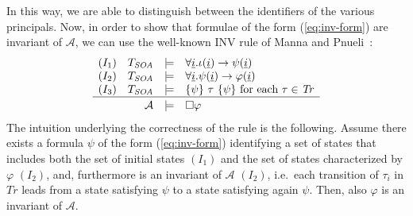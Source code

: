 \documentclass[conference]{IEEEtran}
\begin{document}
In this way, we are able to distinguish between the identifiers of the various principals.  
Now, in order to show that formulae of the form (\ref{eq:inv-form}) are
invariant of $\mathcal{A}$, we can use the well-known INV rule of
Manna and Pnueli~\cite{manna-pnueli-book}:
\begin{eqnarray*}
  \begin{array}{lrcl}
    (I_1) &  T_\mathit{SOA} & \models &
            \forall \underline{i}.\iota(\underline{i})
                                   \rightarrow \psi(\underline{i}) \\
    (I_2) & T_\mathit{SOA} & \models &
            \forall \underline{i}.\psi(\underline{i})
                                   \rightarrow \varphi(\underline{i}) \\
    (I_3) & T_\mathit{SOA} & \models & \{ \psi\}~ \tau~ \{ \psi\} \mbox{ for each } \tau\in \mathit{Tr}\\
    \hline \\[-1em]
          & \mathcal{A} & \models & \Box \varphi
  \end{array}
\end{eqnarray*}
The intuition underlying the correctness of the rule is the following.
Assume there exists a formula $\psi$ of the form
(\ref{eq:inv-form}) identifying a set of states that includes both
the set of initial states $(I_1)$ and the set of states characterized
by $\varphi$ $(I_2)$, and, furthermore is an invariant of
$\mathcal{A}$ $(I_2)$, i.e.\ each transition of $\tau_i$ in
$\mathit{Tr}$ leads from a state satisfying $\psi$ to a state
satisfying again $\psi$.  Then, also $\varphi$ is an invariant of $\mathcal{A}$.  
\end{document}
